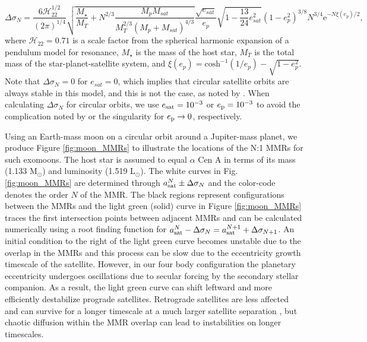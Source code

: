 \documentclass[preprint]{aastex63}
\begin{document}
 \begin{equation} \label{eq:MMR}
     \Delta\sigma_N = \frac{6\mathcal{H}_{22}^{1/2}}{(2\pi)^{1/4}}
     \sqrt{\frac{M_\star}{M_T}+N^{2/3}\frac{M_p M_{sat}}{M_T^{2/3}(M_p+M_{sat})^{4/3}}}
     \frac{\sqrt{e_{sat}}}{e_p}\sqrt{1-\frac{13}{24}e_{sat}^2}(1-e_p^2)^{3/8}N^{3/4}\mathrm{e}^{-N\xi(e_p)/2},
 \end{equation}
where $\mathcal{H}_{22}=0.71$ is a scale factor from the spherical harmonic expansion of a pendulum model for resonance, $M_\star$ is the mass of the host star, $M_T$ is the total mass of the star-planet-satellite system, and $\xi(e_p) = \mathrm{cosh}^{-1}(1/e_p) - \sqrt{1-e_p^2}$.  Note that $\Delta\sigma_N=0$ for $e_{sat}=0$, which implies that circular satellite orbits are always stable in this model, and this is not the case, as noted by \cite{Mardling2013}.  When calculating $\Delta\sigma_N$ for circular orbits, we use $e_{\rm sat}=10^{-3}$ or $e_{\rm p} = 10^{-3}$ to avoid the complication {noted by \citeauthor{Mardling2013} or the singularity for $e_{\rm p}\rightarrow 0$, respectively.}  


{Using an Earth-mass moon on a circular orbit around a Jupiter-mass planet, we produce Figure \ref{fig:moon_MMRs} to illustrate the locations of the N:1 MMRs for such exomoons.  The host star is assumed to equal $\alpha$ Cen A in terms of its mass (1.133 M$_\odot$) and luminosity (1.519 L$_\odot$).  The white curves in Fig. \ref{fig:moon_MMRs} }are determined through $a_{\rm sat}^N \pm \Delta\sigma_N$ and the color-code denotes the order $N$ of the MMR.  The black regions represent configurations between the MMRs and the light green (solid) curve in Figure \ref{fig:moon_MMRs} traces the first intersection points between adjacent MMRs and can be calculated numerically using a root finding function for $a_{\rm sat}^N - \Delta\sigma_N = a_{\rm sat}^{N+1} + \Delta\sigma_{N+1}$.  An initial condition to the right of the light green curve becomes unstable due to the overlap in the MMRs and this process can be slow due to the eccentricity growth timescale of the satellite.  However, in our four body configuration the planetary eccentricity undergoes oscillations due to secular forcing by the secondary stellar companion.  As a result, the light green curve can shift leftward and more efficiently destabilize prograde satellites. Retrograde satellites are less affected and can survive for a longer timescale at a much larger satellite separation \citep{Henon1970}, but chaotic diffusion within the MMR overlap can lead to instabilities on longer timescales. 
\end{document}
